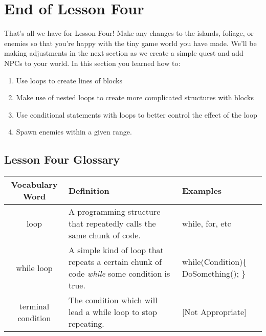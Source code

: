 \documentclass{article}
\begin{document}
\section{End of Lesson Four}

That's all we have for Lesson Four! Make any changes to the islands, foliage, or enemies so that you're happy with the tiny game world you have made. We'll be making adjustments in the next section as we create a simple quest and add NPCs to your world. In this section you learned how to:

\begin{enumerate}
 \item Use loops to create lines of blocks
 \item Make use of nested loops to create more complicated structures with blocks
 \item Use conditional statements with loops to better control the effect of the loop
 \item Spawn enemies within a given range.
\end{enumerate}

\subsection{Lesson Four Glossary}
\begin{center}
\begin{tabular}{ | c | m{5cm}  | m{5cm} | } 
 \hline
 Vocabulary Word & Definition & Examples \\ 
  \hline
  loop & A programming structure that repeatedly calls the same chunk of code. & while, for, etc \\ 
  \hline
 while loop & A simple kind of loop that repeats a certain chunk of code \textit{while} some condition is true. & while(Condition)\{\newline
DoSomething(); \newline
\} \\ 
 \hline
   terminal condition & The condition which will lead a while loop to stop repeating. & [Not Appropriate] \\ 
  \hline
\end{tabular}
\end{center}
\end{document}
